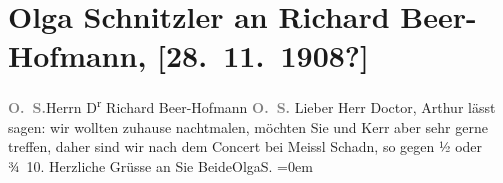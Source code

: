 

         
         \renewcommand{\erwaehntePersonen}{Personen: Richard Beer-Hofmann, Paula Beer-Hofmann, Alfred Kerr}
         \renewcommand{\erwaehnteOrte}{Orte: Meissl & Schadn, Wien}
         \renewcommand{\erwaehnteWerke}{}
               \section[Olga Schnitzler an Richard Beer-Hofmann, {[}28. 11. 1908?{]}]{ Olga Schnitzler an Richard Beer-Hofmann, {[}28. 11. 1908?{]}}\nopagebreak{}\rehead{ }\begin{ledgroupsized}[t]{13cm}\normalsize\beginnumbering \toendnotes[C]{\smallbreak\pagebreak[2]} 
\toendnotes[C]{\smallbreak}\pstart{}{\pb}\textcolor{gray}{\textbf{O. S.}}\pend{}{\bigskip}\pstart{}{\pb}Herrn D\textsuperscript{r} Richard
                  Beer-Hofmann\pend{}{\bigskip}\pstart
           \noindent{}{\pb}\textcolor{gray}{\textbf{O. S.}}\pend
           \pstart{}Lieber Herr Doctor,\pend\pstart
           Arthur lässt sagen: wir wollten zuhause
               nachtmalen, möchten Sie und Kerr aber sehr gerne
               treffen, daher sind wir nach dem Concert bei Meissl {\kaufmannsund} Schadn, so gegen ½ oder
                  ¾ 10.\pend
           \pstart
           Herzliche Grüsse an Sie Beide\spacefill\mbox{OlgaS.}\pend
           \leftskip=0em{}
         
         \endnumbering{}\end{ledgroupsized}  \newcommand{\dateiname}{L01812}\newcommand{\titel}{Olga Schnitzler an Richard Beer-Hofmann, [28. 11. 1908?]}\newcommand{\editorInnen}{Martin Anton Müller und Gerd-Hermann Susen}
      